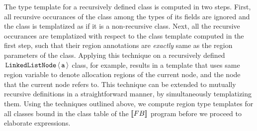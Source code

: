 \vspace*{-0.1in}

The type template for a recursively defined class is computed in two
steps. First, all recursive occurances of the class among the types of
its fields are ignored and the class is templatized as if it is a
non-recursive class. Next, all the recursive occurances are
templatized with respect to the class template computed in the first
step, such that their region annotations are \emph{exactly} same as
the region parameters of the class. Applying this technique on a
recursively defined $\,{\tt LinkedListNode}\,\langle \,{\tt a}\, \rangle$ class, for
example, results in a template that uses same region variable to
denote allocation regions of the current node, and the node that the
current node refers to. 
This technique can be extended to mutually recursive definitions in a
straightforward manner, by simultaneously templatizing them. Using the
techniques outlined above, we compute region type templates for all
classes bound in the class table of the $\llbracket {\sc FB} \rrbracket$ program before
we proceed to elaborate expressions.

